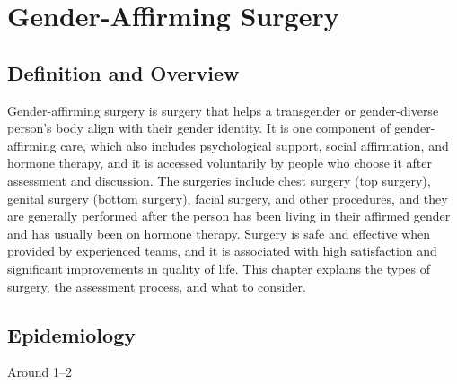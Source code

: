 \chapter{Gender-Affirming Surgery}

\section*{Definition and Overview}
Gender-affirming surgery is surgery that helps a transgender or gender-diverse person's body align with their gender identity. It is one component of gender-affirming care, which also includes psychological support, social affirmation, and hormone therapy, and it is accessed voluntarily by people who choose it after assessment and discussion. The surgeries include chest surgery (top surgery), genital surgery (bottom surgery), facial surgery, and other procedures, and they are generally performed after the person has been living in their affirmed gender and has usually been on hormone therapy. Surgery is safe and effective when provided by experienced teams, and it is associated with high satisfaction and significant improvements in quality of life. This chapter explains the types of surgery, the assessment process, and what to consider.

\section*{Epidemiology}
Around 1--2%

